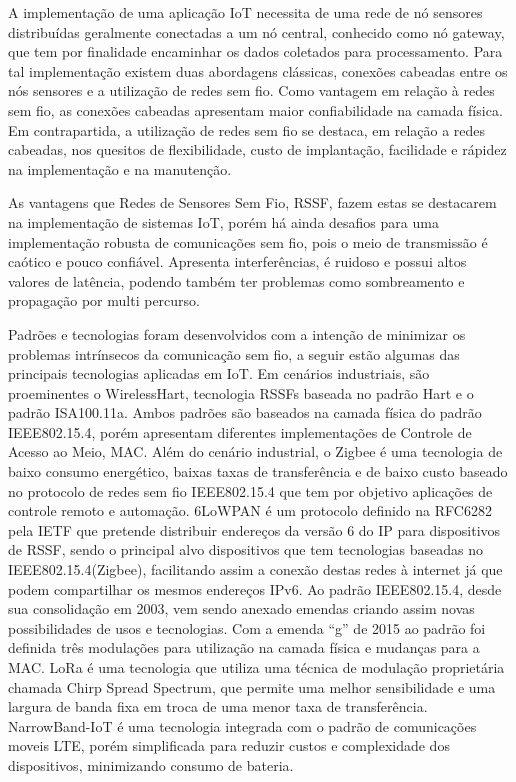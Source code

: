 A implementação de uma aplicação IoT necessita de uma rede de nó sensores distribuídas geralmente conectadas a um nó central, conhecido como nó gateway, que tem por finalidade encaminhar os dados coletados para processamento. Para tal implementação existem duas abordagens clássicas, conexões cabeadas entre os nós sensores e a utilização de redes sem fio\cite{gomes2017estimaccao}. Como vantagem em relação à redes sem fio, as conexões cabeadas apresentam maior confiabilidade na camada física. Em contrapartida, a utilização de redes sem fio se destaca, em relação a redes cabeadas, nos quesitos de flexibilidade, custo de implantação, facilidade e rápidez na implementação e na manutenção\cite{gungor2009industrial}.

As vantagens que Redes de Sensores Sem Fio, RSSF, fazem estas se destacarem na implementação de sistemas IoT, porém há ainda desafios para uma implementação robusta de comunicações sem fio, pois o meio de transmissão é caótico e pouco confiável. Apresenta interferências, é ruidoso e possui altos valores de latência, podendo também ter problemas como sombreamento e propagação por multi percurso\cite{gomes2017estimaccao}.

Padrões e tecnologias foram desenvolvidos com a intenção de minimizar os problemas intrínsecos da comunicação sem fio, a seguir estão algumas das principais tecnologias aplicadas em IoT. Em cenários industriais, são proeminentes o WirelessHart, tecnologia RSSFs baseada no padrão Hart\cite{WIHART} e o padrão ISA100.11a. Ambos padrões são baseados na camada física do padrão IEEE802.15.4, porém apresentam diferentes implementações de Controle de Acesso ao Meio\cite{gomes2017estimaccao}, MAC. Além do cenário industrial, o Zigbee é uma tecnologia de baixo consumo energético, baixas taxas de transferência e de baixo custo baseado no protocolo de redes sem fio IEEE802.15.4 que tem por objetivo aplicações de controle remoto e automação\cite{ergen2004zigbee}. 6LoWPAN é um protocolo definido na RFC6282 pela IETF que pretende distribuir endereços da versão 6 do IP para dispositivos de RSSF, sendo o principal alvo dispositivos que tem tecnologias baseadas no IEEE802.15.4(Zigbee), facilitando assim a conexão destas redes à internet já que podem compartilhar os mesmos endereços IPv6\cite{olsson20146lowpan}. Ao padrão IEEE802.15.4, desde sua consolidação em 2003, vem sendo anexado emendas criando assim novas possibilidades de usos e tecnologias. Com a emenda ``g'' de 2015 ao padrão foi definida três modulações para utilização na camada física e mudanças para a MAC\cite{chang2012ieee}. LoRa é uma tecnologia que utiliza uma técnica de modulação proprietária chamada Chirp Spread Spectrum, que permite uma melhor sensibilidade e uma largura de banda fixa em troca de uma menor taxa de transferência\cite{sinha2017survey}. NarrowBand-IoT é uma tecnologia integrada com o padrão de comunicações moveis LTE, porém simplificada para reduzir custos e complexidade dos dispositivos, minimizando consumo de bateria\cite{sinha2017survey}.


